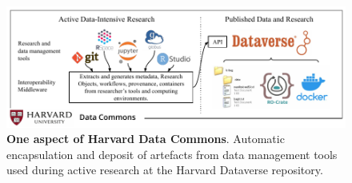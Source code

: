 
\begin{figure}[t!]
    \centering
    \includegraphics{content/images/data-commons-ro-crate-figure-5.pdf}
    \caption{\textbf{One aspect of Harvard Data Commons}. Automatic encapsulation and deposit of artefacts from data management tools used during active research at the Harvard Dataverse repository.}
    \label{fig:hdc}
\end{figure}
